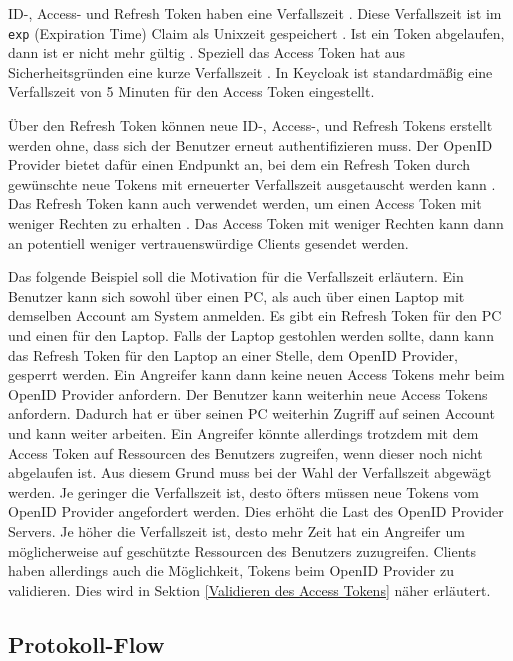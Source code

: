 ID-, Access- und Refresh Token haben eine Verfallszeit \cite[Sec. 4.1.4]{RFC7519} \cite[ID Token]{EB4}. Diese Verfallszeit ist im \texttt{exp} (Expiration Time) Claim als Unixzeit gespeichert \cite[Sec. 4.1.4]{RFC7519}. Ist ein Token abgelaufen, dann ist er nicht mehr gültig \cite[Sec. 4.1.4]{RFC7519}. Speziell das Access Token hat aus Sicherheitsgründen eine kurze Verfallszeit \cite{EB61}. In Keycloak ist standardmäßig eine Verfallszeit von 5 Minuten für den Access Token eingestellt.

Über den Refresh Token können neue ID-, Access-, und Refresh Tokens erstellt werden ohne, dass sich der Benutzer erneut authentifizieren muss. Der OpenID Provider bietet dafür einen Endpunkt an, bei dem ein Refresh Token durch gewünschte neue Tokens mit erneuerter Verfallszeit ausgetauscht werden kann \cite[Sec. 1.5]{RFC6749}. Das Refresh Token kann auch verwendet werden, um einen Access Token mit weniger Rechten zu erhalten \cite{EB12}. Das Access Token mit weniger Rechten kann dann an potentiell weniger vertrauenswürdige Clients gesendet werden.

Das folgende Beispiel soll die Motivation für die Verfallszeit erläutern. Ein Benutzer kann sich sowohl über einen PC, als auch über einen Laptop mit demselben Account am System anmelden. Es gibt ein Refresh Token für den PC und einen für den Laptop. Falls der Laptop gestohlen werden sollte, dann kann das Refresh Token für den Laptop an einer Stelle, dem OpenID Provider, gesperrt werden. Ein Angreifer kann dann keine neuen Access Tokens mehr beim OpenID Provider anfordern. Der Benutzer kann weiterhin neue Access Tokens anfordern. Dadurch hat er über seinen PC weiterhin Zugriff auf seinen Account und kann weiter arbeiten. Ein Angreifer könnte allerdings trotzdem mit dem Access Token auf Ressourcen des Benutzers zugreifen, wenn dieser noch nicht abgelaufen ist. Aus diesem Grund muss bei der Wahl der Verfallszeit abgewägt werden. Je geringer die Verfallszeit ist, desto öfters müssen neue Tokens vom OpenID Provider angefordert werden. Dies erhöht die Last des OpenID Provider Servers. Je höher die Verfallszeit ist, desto mehr Zeit hat ein Angreifer um möglicherweise auf geschützte Ressourcen des Benutzers zuzugreifen. Clients haben allerdings auch die Möglichkeit, Tokens beim OpenID Provider zu validieren. Dies wird in Sektion \ref{Validieren des Access Tokens} näher erläutert.

\subsection{Protokoll-Flow} \label{EB_Flows}

